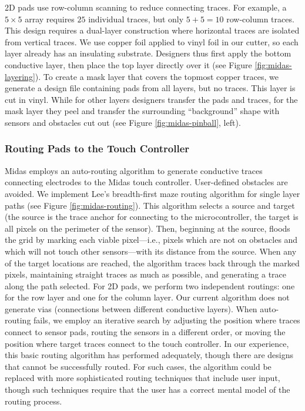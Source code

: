 2D pads use row-column scanning to reduce connecting traces.
For example, a $5 × 5$ array requires $25$ individual traces, but
only $5 + 5 = 10$ row-column traces. This design requires a
dual-layer construction where horizontal traces are isolated
from vertical traces. We use copper foil applied to vinyl foil
in our cutter, so each layer already has an insulating substrate.
Designers thus first apply the bottom conductive layer,
then place the top layer directly over it (see Figure \ref{fig:midas-layering}).
To create a mask layer that covers the topmost copper traces,
we generate a design file containing pads from all layers, but
no traces. This layer is cut in vinyl. While for other layers
designers transfer the pads and traces, for the mask layer they
peel and transfer the surrounding “background” shape with
sensors and obstacles cut out (see Figure \ref{fig:midas-pinball}, left).


        \subsubsection{Routing Pads to the Touch Controller}
Midas employs an auto-routing algorithm to generate conductive
traces connecting electrodes to the Midas touch controller.
User-defined obstacles are avoided. We implement
Lee's breadth-first maze routing algorithm for single layer
paths \cite{lee-maze} (see Figure \ref{fig:midas-routing}). This algorithm selects a source and target (the source is the trace anchor for connecting to the microcontroller, the target is all pixels on the perimeter of the sensor). Then, beginning at the source, floods the grid by marking each viable pixel---i.e., pixels which are not on obstacles and which will not touch other sensors---with its distance from the source. When any of the target locations are reached, the algorithm traces back through the marked pixels, maintaining straight traces as much as possible, and generating a trace along the path selected. For 2D pads, we perform two independent routings:
one for the row layer and one for the column layer. Our
current algorithm does not generate vias (connections between
different conductive layers). When auto-routing fails,
we employ an iterative search by adjusting the position where
traces connect to sensor pads, routing the sensors in a different
order, or moving the position where target traces connect
to the touch controller. In our experience, this basic routing
algorithm has performed adequately, though there are designs
that cannot be successfully routed. For such cases, the
algorithm could be replaced with more sophisticated routing
techniques that include user input, though such techniques
require that the user has a correct mental model of the routing
process.

